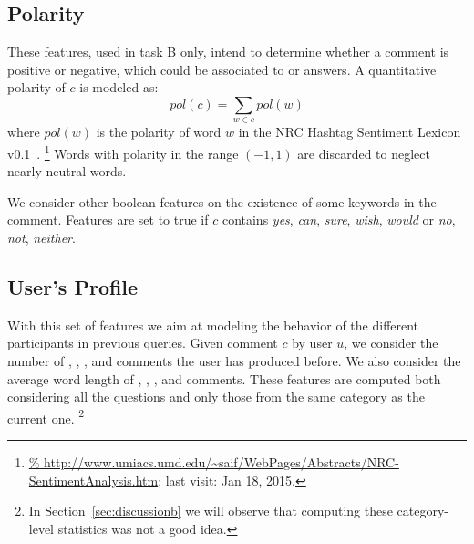 
\subsection{Polarity}
\label{sub:polarity}

These features, used in task B only, intend to determine whether a comment is 
positive or negative, which could be associated to \yes or \no answers. A 
quantitative polarity of $c$ is modeled as:
\begin{equation}
pol(c) = \sum_{w\in c} pol(w) 
\end{equation}
%
where $pol(w)$ is the polarity of word $w$ in the NRC Hashtag Sentiment 
Lexicon v0.1~\cite{MohammadKZ2013}.%
\footnote{\url{%
http://www.umiacs.umd.edu/~saif/WebPages/Abstracts/NRC-SentimentAnalysis.htm}; 
last visit: Jan 18, 2015.}
Words with polarity in the range $(-1,1)$ are discarded to neglect nearly 
neutral words.

We consider other boolean features on the existence of some keywords in the 
comment. Features are set to true if $c$ contains
\Ni \textit{yes}, \textit{can}, \textit{sure}, \textit{wish}, \textit{would} or
\Nii \textit{no}, \textit{not}, \textit{neither}.


\subsection{User's Profile}
\label{sub:profile}

With this set of features we aim at modeling the behavior of the different 
participants in previous queries. Given comment $c$ by user $u$, we consider 
the number of \good, \bad, \pot, and \dial comments the user has produced 
before. We also consider the average word length of \good, \bad, \pot, and \dial 
comments. These features are computed both considering all the questions and 
only those from the same category as the current one.%
\footnote{In Section~\ref{sec:discussionb} we will observe that computing these 
category-level statistics was not a good idea.}



